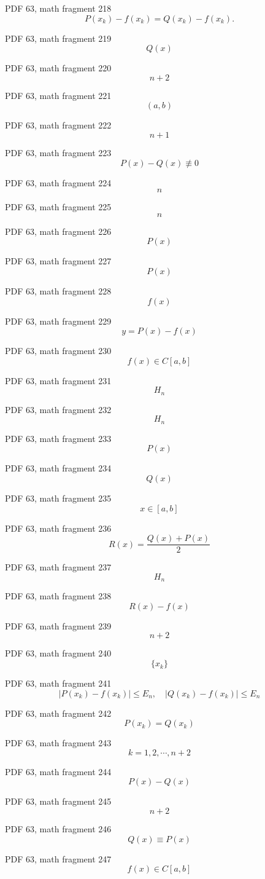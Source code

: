 \documentclass[UTF8,fontset=fandol]{ctexart}
\begin{document}
\par
PDF 63, math fragment 218
\[
P(x_k)-f(x_k)=Q(x_k)-f(x_k).
\]
\par
PDF 63, math fragment 219
\[Q(x)\]
\par
PDF 63, math fragment 220
\[n+2\]
\par
PDF 63, math fragment 221
\[(a,b)\]
\par
PDF 63, math fragment 222
\[n+1\]
\par
PDF 63, math fragment 223
\[P(x)-Q(x) \not\equiv 0\]
\par
PDF 63, math fragment 224
\[n\]
\par
PDF 63, math fragment 225
\[n\]
\par
PDF 63, math fragment 226
\[P(x)\]
\par
PDF 63, math fragment 227
\[P(x)\]
\par
PDF 63, math fragment 228
\[f(x)\]
\par
PDF 63, math fragment 229
\[y=P(x)-f(x)\]
\par
PDF 63, math fragment 230
\[f(x) \in C[a,b]\]
\par
PDF 63, math fragment 231
\[H_n\]
\par
PDF 63, math fragment 232
\[H_n\]
\par
PDF 63, math fragment 233
\[P(x)\]
\par
PDF 63, math fragment 234
\[Q(x)\]
\par
PDF 63, math fragment 235
\[x \in [a,b]\]
\par
PDF 63, math fragment 236
\[R(x)=\frac{Q(x)+P(x)}{2}\]
\par
PDF 63, math fragment 237
\[H_n\]
\par
PDF 63, math fragment 238
\[R(x)-f(x)\]
\par
PDF 63, math fragment 239
\[n+2\]
\par
PDF 63, math fragment 240
\[\{x_k\}\]
\par
PDF 63, math fragment 241
\[\left|P(x_k)-f(x_k)\right| \leqslant E_n, \quad \left|Q(x_k)-f(x_k)\right| \leqslant E_n\]
\par
PDF 63, math fragment 242
\[P(x_k)=Q(x_k)\]
\par
PDF 63, math fragment 243
\[k=1,2,\cdots,n+2\]
\par
PDF 63, math fragment 244
\[P(x)-Q(x)\]
\par
PDF 63, math fragment 245
\[n+2\]
\par
PDF 63, math fragment 246
\[Q(x) \equiv P(x)\]
\par
PDF 63, math fragment 247
\[f(x) \in C[a,b]\]
\end{document}
